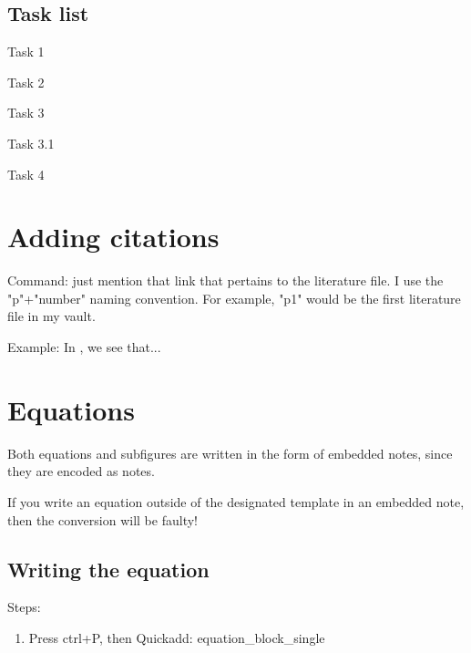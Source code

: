 \documentclass{extarticle}
\begin{document}
\subsection{Task list}

\begin{todolist}
\item Task 1
\item Task 2
\item Task 3
\begin{todolist}
\item Task 3.1
\end{todolist}
\item Task 4
\end{todolist}
\section{Adding citations} \label{sec:Adding-citations}

Command: just mention that link that pertains to the literature file. I use the "p"+"number" naming convention. For example, "p1" would be the first literature file in my vault.



Example: In \cite{p1}, we see that...  \hypertarget{ad3b86}{}



\section{Equations}

Both equations and subfigures are written in the form of embedded notes, since they are encoded as notes.

\begin{tcolorbox}[width=1.0\textwidth,colback={red},title={warning},outer arc=0mm,colupper=white]

If you write an equation outside of the designated template in an embedded note, then the conversion will be faulty!

\end{tcolorbox}

\subsection{Writing the equation}



Steps:



\begin{enumerate}
\item Press ctrl+P, then Quickadd: equation\_block\_single
\end{enumerate}
\end{document}
